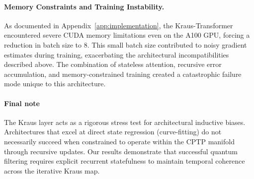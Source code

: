 \documentclass{article} %
\begin{document}
\paragraph{Memory Constraints and Training Instability.}
As documented in Appendix~\ref{app:implementation}, the Kraus-Transformer encountered severe CUDA memory limitations even on the A100 GPU, forcing a reduction in batch size to 8. This small batch size contributed to noisy gradient estimates during training, exacerbating the architectural incompatibilities described above. The combination of stateless attention, recursive error accumulation, and memory-constrained training created a catastrophic failure mode unique to this architecture.

\paragraph{Final note}
The Kraus layer acts as a rigorous stress test for architectural inductive biases. Architectures that excel at direct state regression (curve-fitting) do not necessarily succeed when constrained to operate within the CPTP manifold through recursive updates. Our results demonstrate that successful quantum filtering requires explicit recurrent statefulness to maintain temporal coherence across the iterative Kraus map.
\end{document}
